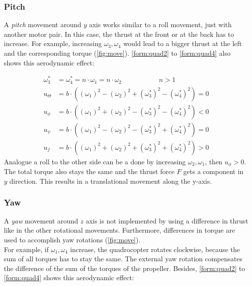 \newpage

\subsubsection{Pitch}

A \emph{pitch} movement around $y$ axis works similar to a roll movement, 
just with another motor pair. 
In this case, the thrust at the front or at the back has to increase. 
For example, increasing $\omega_3, \omega_4$ would lead to a bigger thrust at the left
and the corresponding torque (\cref{fig:move}). \cref{form:quad2} to \cref{form:quad4} also shows this aerodynamic effect:

\begin{align*}
	\omega_3^* &= \omega_4^* = n \cdot \omega_1 = n \cdot \omega_2 \qquad \qquad \quad \enspace  n > 1\\
	u_{\Theta} &= b \cdot ((\omega_1)^2 - (\omega_2)^2 + (\omega_3^*)^2 - (\omega_4^*)^2) = 0\\
	u_{\phi} &= b \cdot ((\omega_1)^2 + (\omega_2)^2 - (\omega_3^*)^2 - (\omega_4^*)^2) < 0 \\
	u_{\psi} &= b \cdot ((\omega_1)^2 - (\omega_2)^2 - (\omega_3^*)^2 + (\omega_4^*)^2)	= 0 \\
	u_f &= b \cdot ((\omega_1)^2 + (\omega_2)^2 + (\omega_3^*)^2 + (\omega_4^*)^2) > 0 
\end{align*}
\newline
Analogue a roll to the other side can be a done by increasing $\omega_2, \omega_1$, then $u_{\phi} > 0$. 
The total torque also stays the same and the thrust force $F$ gets a component in $y$ direction. This results in a translational movement along the y-axis.


\subsubsection{Yaw}
A \emph{yaw} movement around $z$ axis is not implemented by using a difference in thrust like in the other rotational movements. 
Furthermore, differences in torque are used to accomplish yaw rotations (\cref{fig:move}). \\
For example, if $\omega_1, \omega_4$  increase, the quadrocopter rotates clockwise, 
because the sum of all torques has to stay the same. The external yaw rotation compensates the difference of the sum of the torques of the propeller. 
Besides, \cref{form:quad2} to \cref{form:quad4} shows this aerodynamic effect:

